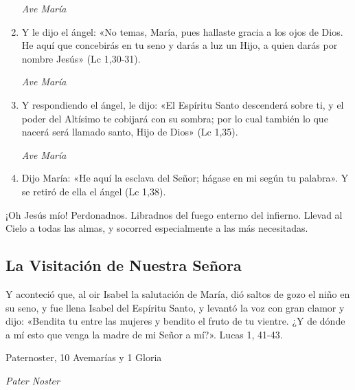 \documentclass[a4paper,11pt, oneside]{report}
\begin{document}
\begin{enumerate}
          \textit{Ave María}

          \item Y le dijo el ángel: «No temas, María, pues hallaste gracia a los ojos de Dios. He aquí que concebirás en tu seno y darás a luz un Hijo,
          a quien darás por nombre Jesús» (Lc 1,30-31).

          \textit{Ave María}

          \item Y respondiendo el ángel, le dijo: «El Espíritu Santo descenderá sobre ti, y el poder del Altísimo te cobijará con su sombra; por lo cual
          también lo que nacerá será llamado santo, Hijo de Dios» (Lc 1,35).

          \textit{Ave María}

          \item Dijo María: «He aquí la esclava del Señor; hágase en mi según tu palabra». Y se retiró de ella el ángel (Lc 1,38).
          
        \end{enumerate}
        
        
        \medskip
        ¡Oh Jesús mío! Perdonadnos. Libradnos del fuego enterno del infierno. Llevad al Cielo a todas las almas, y socorred especialmente a las más necesitadas.

      \subsection*{La Visitación de Nuestra Señora}
        Y aconteció que, al oir Isabel la salutación de María, dió saltos de gozo el niño en su seno, y fue llena Isabel del Espíritu Santo, y levantó la voz con gran
        clamor y dijo: «Bendita tu entre las mujeres y bendito el fruto de tu vientre. ¿Y de dónde a mí esto que venga la madre de mi Señor a mí?». 
        Lucas 1, 41-43.
        
         Paternoster, 10 Avemarías y 1 Gloria
        
        \textit{Pater Noster} 
\end{document}
